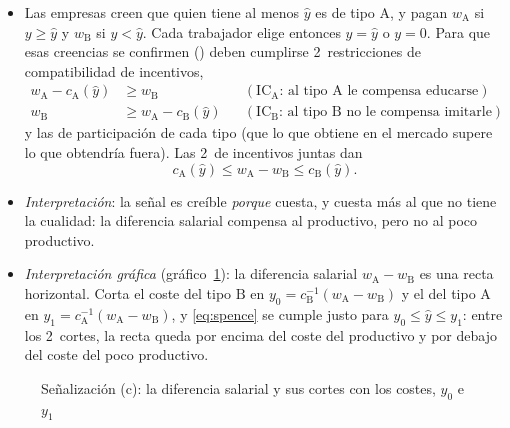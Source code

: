 \documentclass[11pt]{article}
\begin{document}
\begin{itemize}
\item Las empresas creen que quien tiene al menos $\hat y$ es de tipo $\mathrm{A}$, y pagan $w_{\mathrm{A}}$ si $y\geq\hat y$ y $w_{\mathrm{B}}$ si $y<\hat y$. Cada trabajador elige entonces $y=\hat y$ o $y=0$. Para que esas creencias se confirmen () deben cumplirse 2~restricciones de compatibilidad de incentivos,
  \begin{align*}
  w_{\mathrm{A}}-c_{\mathrm{A}}(\hat y)&\geq w_{\mathrm{B}} && (\mathrm{IC}_{\mathrm{A}}\text{: al tipo A le compensa educarse})\\
  w_{\mathrm{B}}&\geq w_{\mathrm{A}}-c_{\mathrm{B}}(\hat y) && (\mathrm{IC}_{\mathrm{B}}\text{: al tipo B no le compensa imitarle})
  \end{align*}
  y las de participación de cada tipo (que lo que obtiene en el mercado supere lo que obtendría fuera). Las 2~de incentivos juntas dan
  \begin{equation}
  c_{\mathrm{A}}(\hat y)\leq w_{\mathrm{A}}-w_{\mathrm{B}}\leq c_{\mathrm{B}}(\hat y). \label{eq:spence}
  \end{equation}
\item \emph{Interpretación}: la señal es creíble \emph{porque} cuesta, y cuesta más al que no tiene la cualidad: la diferencia salarial compensa al productivo, pero no al poco productivo.
\item \emph{Interpretación gráfica} (gráfico~\ref{fig:spence-c}): la diferencia salarial $w_{\mathrm{A}}-w_{\mathrm{B}}$ es una recta horizontal. Corta el coste del tipo $\mathrm{B}$ en $y_0=c_{\mathrm{B}}^{-1}(w_{\mathrm{A}}-w_{\mathrm{B}})$ y el del tipo $\mathrm{A}$ en $y_1=c_{\mathrm{A}}^{-1}(w_{\mathrm{A}}-w_{\mathrm{B}})$, y \eqref{eq:spence} se cumple justo para $y_0\leq\hat y\leq y_1$: entre los 2~cortes, la recta queda por encima del coste del productivo y por debajo del coste del poco productivo.
\end{itemize}

\begin{figure}[H]
\centering
\caption{Señalización (c): la diferencia salarial y sus cortes con los costes, $y_0$ e $y_1$}\label{fig:spence-c}
\end{figure}
\end{document}
